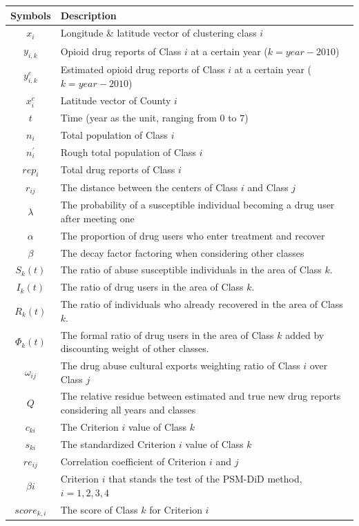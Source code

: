 \documentclass{mcmthesis}
\begin{document}
\begin{tabular}{cp{}}
\toprule
 Symbols & Description\\
\midrule
 $x_i$ & Longitude \& latitude vector of clustering class $i$\\
 $y_{i,k}$ & Opioid drug reports of Class $i$ at a certain year ($k=year-2010$) \\
 $y^e_{i,k}$ & Estimated opioid drug reports of Class $i$ at a certain year ($k=year-2010$) \\
 $x^c_i$ & Latitude vector of County $i$ \\
 $t$ & Time (year as the unit, ranging from $0$ to $7$) \\
 $n_i$ & Total population of Class $i$\\
 $n^{'}_{i}$ & Rough total population of Class $i$\\
 $rep_{i}$ & Total drug reports of Class $i$\\
 $r_{ij}$ & The distance between the centers of Class $i$ and Class $j$\\
 $\lambda$ & The probability of a susceptible individual becoming a drug user after meeting  one\\
 $\alpha$ & The proportion of drug users who enter treatment and recover\\
 $\beta$ & The decay factor factoring when considering other classes\\
 $S_k(t)$ & The ratio of abuse susceptible individuals in the area of Class $k$. \\
 $I_k(t)$ & The ratio of drug users in the area of Class $k$. \\$R_k(t)$ & The ratio of individuals who already recovered in the area of Class $k$. \\
 $\Phi_k(t)$ & The formal ratio of drug users in the area of Class $k$ added by discounting weight of other classes. \\
 $\omega_{ij}$ & The drug abuse cultural exports weighting ratio of Class $i$ over Class $j$\\
 $Q$ & The relative residue between estimated and true new drug reports considering all years and classes\\
 $c_{ki}$ &The Criterion $i$ value of Class $k$\\
 $s_{ki}$ &The standardized Criterion $i$ value of Class $k$\\
 $re_{ij}$ & Correlation coefficient of Criterion $i$ and $j$\\
 $\beta i$ & Criterion $i$ that stands the test of the PSM-DiD method, $i=1,2,3,4$\\
 $score_{k,i}$ & The score of Class $k$ for Criterion $i$\\
 
 
\bottomrule
\end{tabular}
\end{document}
